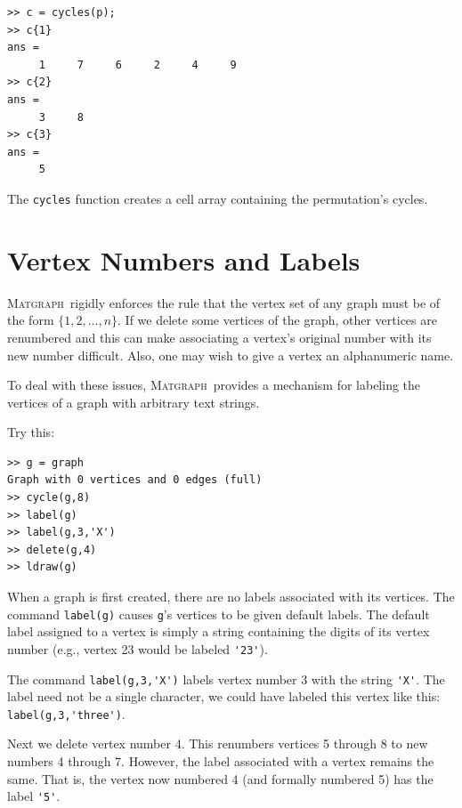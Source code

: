 \documentclass[12pt]{amsart}
\newcommand\matgraph{\textsc{Matgraph}}
\begin{document}
\begin{verbatim}
>> c = cycles(p);
>> c{1}
ans =
     1     7     6     2     4     9
>> c{2}
ans =
     3     8
>> c{3}
ans =
     5
\end{verbatim}
The \verb|cycles| function creates a cell array containing the
permutation's cycles. 


\section{Vertex Numbers and Labels}

\matgraph\ rigidly enforces the rule that the vertex set of any graph
must be of the form $\{1,2,\ldots,n\}$. If we delete some vertices of
the graph, other vertices are renumbered and this can make associating
a vertex's original number with its new number difficult. Also, one
may wish to give a vertex an alphanumeric name. 

To deal with these issues, \matgraph\ provides a mechanism for
labeling the vertices of a graph with arbitrary text strings. 

Try this:
\begin{verbatim}
>> g = graph
Graph with 0 vertices and 0 edges (full)
>> cycle(g,8)
>> label(g)
>> label(g,3,'X')
>> delete(g,4)
>> ldraw(g)
\end{verbatim}
When a graph is first created, there are no labels associated with its
vertices. The command \verb|label(g)| causes \verb|g|'s vertices to be
given default labels. The default label assigned to a vertex is simply
a string containing the digits of its vertex number (e.g., vertex 23
would be labeled \verb|'23'|). 

The command \verb|label(g,3,'X')| labels vertex number 3 with the
string \verb|'X'|. The label need not be a single character, we could
have labeled this vertex like this: \verb|label(g,3,'three')|. 

Next we delete vertex number 4. This renumbers vertices 5 through 8 to
new numbers 4 through 7. However, the label associated with a vertex
remains the same. That is, the vertex now numbered 4 (and formally
numbered 5) has the label \verb|'5'|. 
\end{document}
